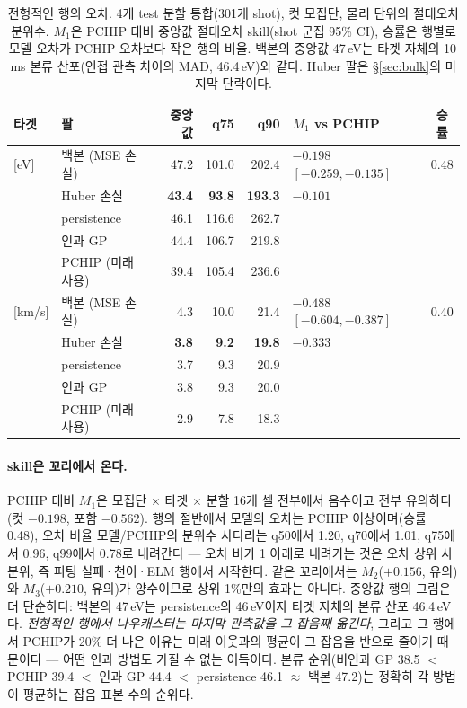 \documentclass[10pt,a4paper]{article}
\begin{document}
\begin{table}[t]
  \centering
  \caption{전형적인 행의 오차. 4개 test 분할 통합(301개 shot), 컷 모집단, 물리
  단위의 절대오차 분위수. $M_1$은 PCHIP 대비 중앙값 절대오차 skill(shot 군집 95\%
  CI), 승률은 행별로 모델 오차가 PCHIP 오차보다 작은 행의 비율. \Ti{} 백본의
  중앙값 47\,eV는 타겟 자체의 10\,ms 본류 산포(인접 관측 차이의 MAD, 46.4\,eV)와
  같다. Huber 팔은 \S\ref{sec:bulk}의 마지막 단락이다.}
  \label{tab:bulk}
  \small
  \begin{tabular}{llrrrlc}
    \toprule
    타겟 & 팔 & 중앙값 & q75 & q90 & $M_1$ vs PCHIP & 승률 \\
    \midrule
    \Ti{} [eV]
      & \seqv{} 백본 (MSE 손실) & 47.2 & 101.0 & 202.4 & $-0.198$ $[-0.259, -0.135]$ & 0.48 \\
      & \seqv{} Huber 손실 & \textbf{43.4} & \textbf{93.8} & \textbf{193.3} & $-0.101$ & \\
      & persistence & 46.1 & 116.6 & 262.7 & & \\
      & 인과 GP & 44.4 & 106.7 & 219.8 & & \\
      & PCHIP (미래 사용) & 39.4 & 105.4 & 236.6 & & \\
    \midrule
    \Vrot{} [km/s]
      & \seqv{} 백본 (MSE 손실) & 4.3 & 10.0 & 21.4 & $-0.488$ $[-0.604, -0.387]$ & 0.40 \\
      & \seqv{} Huber 손실 & \textbf{3.8} & \textbf{9.2} & \textbf{19.8} & $-0.333$ & \\
      & persistence & 3.7 & 9.3 & 20.9 & & \\
      & 인과 GP & 3.8 & 9.3 & 20.0 & & \\
      & PCHIP (미래 사용) & 2.9 & 7.8 & 18.3 & & \\
    \bottomrule
  \end{tabular}
\end{table}

\paragraph{\Ti{} skill은 꼬리에서 온다.} PCHIP 대비 $M_1$은 모집단 $\times$ 타겟
$\times$ 분할 16개 셀 전부에서 음수이고 전부 유의하다(컷 \Ti{} $-0.198$, 포함
$-0.562$). 행의 절반에서 모델의 오차는 PCHIP 이상이며(승률 0.48), 오차 비율
모델/PCHIP의 분위수 사다리는 q50에서 1.20, q70에서 1.01, q75에서 0.96, q99에서
0.78로 내려간다 --- 오차 비가 1 아래로 내려가는 것은 오차 상위 사분위, 즉 피팅
실패·천이·ELM 행에서 시작한다. 같은 꼬리에서는 $M_2$($+0.156$, 유의)와 $M_3$($+0.210$, 유의)가
양수이므로 상위 1\%만의 효과는 아니다. 중앙값 행의 그림은 더 단순하다: 백본의
47\,eV는 persistence의 46\,eV이자 타겟 자체의 본류 산포 46.4\,eV다. \emph{전형적인
행에서 나우캐스터는 마지막 관측값을 그 잡음째 옮긴다}, 그리고 그 행에서 PCHIP가
20\% 더 나은 이유는 미래 이웃과의 평균이 그 잡음을 반으로 줄이기 때문이다
--- 어떤 인과 방법도 가질 수 없는 이득이다. 본류 순위(비인과 GP 38.5 $<$ PCHIP
39.4 $<$ 인과 GP 44.4 $<$ persistence 46.1 $\approx$ 백본 47.2)는 정확히 각 방법이
평균하는 잡음 표본 수의 순위다.
\end{document}
